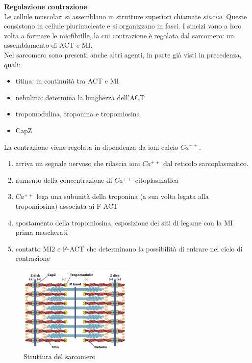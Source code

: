             \textbf{Regolazione contrazione}\\
                Le cellule muscolari si assemblano in strutture superiori chiamate \textit{sincizi}. Queste consistono in cellule plurinucleate e si organizzano in fasci. I sincizi vano a loro volta a formare le miofibrille, la cui contrazione è regolata dal sarcomero: un assemblamento di ACT e MI. \\
                Nel sarcomero sono presenti anche altri agenti, in parte già visti in precedenza, quali:
                \begin{itemize}
                    \item titina: in continuità tra ACT e MI
                    \item nebulina: determina la lunghezza dell'ACT
                    \item tropomodulina, troponina e tropomiosina
                    \item CapZ
                \end{itemize}
                La contrazione viene regolata in dipendenza da ioni calcio $Ca^{++}$.
                \begin{enumerate}
                    \item arriva un segnale nervoso che rilascia ioni $Ca^{++}$ dal reticolo sarcoplasmatico. 
                    \item aumento della concentrazione di $Ca^{++}$ citoplasmatica
                    \item $Ca^{++}$ lega una subunità della troponina (a sua volta legata alla tropomiosina) associata ai F-ACT
                    \item spostamento della tropomiosina, esposizione dei siti di legame con la MI prima mascherati
                    \item contatto MI2 e F-ACT che determinano la possibilità di entrare nel ciclo di contrazione
                \end{enumerate}
                \begin{figure}[h]
                    \centering 
                    \includegraphics[width=0.5\textwidth]{images/sarcomero.JPG}
                    \caption{\small Struttura del sarcomero}
                    \label{fig:mesh1}
                \end{figure}
            
